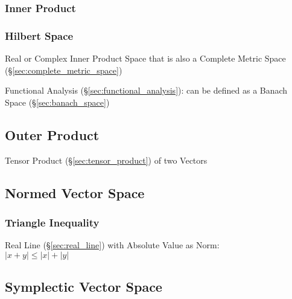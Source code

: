 \subsubsection{Inner Product}\label{sec:inner_product}

\subsubsection{Hilbert Space}\label{sec:hilbert_space}

Real or Complex Inner Product Space that is also a Complete Metric
Space (\S\ref{sec:complete_metric_space})

Functional Analysis (\S\ref{sec:functional_analysis}): can be defined
as a Banach Space (\S\ref{sec:banach_space})



\subsection{Outer Product}\label{sec:outer_product}

Tensor Product (\S\ref{sec:tensor_product}) of two Vectors



\subsection{Normed Vector Space}\label{sec:normed_vectorspace}

\subsubsection{Triangle Inequality}\label{sec:triangle_inequality}

Real Line (\S\ref{sec:real_line}) with Absolute Value as Norm:\\
$|x + y| \leq |x| + |y|$



\subsection{Symplectic Vector Space}\label{sec:symplectic_vectorspace}

